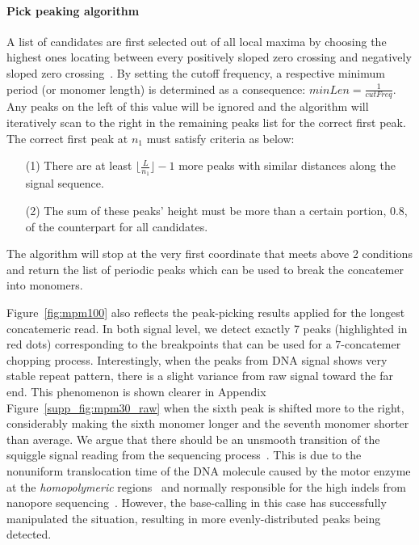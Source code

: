 \paragraph{Pick peaking algorithm}
A list of candidates are first selected out of all local maxima by choosing the highest ones locating between every positively sloped zero crossing and negatively sloped zero crossing~\cite{Mcleod2005tartini}.
By setting the cutoff frequency, a respective minimum period (or monomer length) is determined as a consequence: $minLen=\frac{\displaystyle 1}{\displaystyle cutFreq}$. 
Any peaks on the left of this value will be ignored and the algorithm will iteratively scan to the right in the remaining peaks list for the correct first peak.
The correct first peak at $n_1$ must satisfy criteria as below:
\begin{itemize}
    \item[(1)] There are at least $\lfloor \frac{\displaystyle L}{\displaystyle n_1} \rfloor - 1$ more peaks with similar distances along the signal sequence.
    \item[(2)] The sum of these peaks' height must be more than a certain portion, \EG{} $0.8$, of the counterpart for all candidates.
\end{itemize}
The algorithm will stop at the very first coordinate that meets above 2 conditions and return the list of periodic peaks which can be used to break the concatemer into monomers. 

Figure~\ref{fig:mpm100} also reflects the peak-picking results applied for the longest concatemeric read. 
In both signal level, we detect exactly 7 peaks (highlighted in red dots) corresponding to the breakpoints that can be used for a $7$-concatemer chopping process.
Interestingly, when the peaks from DNA signal shows very stable repeat pattern, there is a slight variance from raw signal toward the far end. 
This phenomenon is shown clearer in Appendix Figure~\ref{supp_fig:mpm30_raw} when the sixth peak is shifted more to the right, considerably making the sixth monomer longer and the seventh monomer shorter than average.
We argue that there should be an unsmooth transition of the squiggle signal reading from the sequencing process~\cite{Rang2018squiggle}.
This is due to the nonuniform translocation time of the DNA molecule caused by the motor enzyme at the \emph{homopolymeric} regions~\cite{Manrao2012reading,Cherf2012automated,Sarkozy2017calling} and normally responsible for the high indels from nanopore sequencing~\cite{Jain2018nanopore3,Stancu2017nanopore5,Ip2015minion}.
However, the base-calling in this case has successfully manipulated the situation, resulting in more evenly-distributed peaks being detected.


